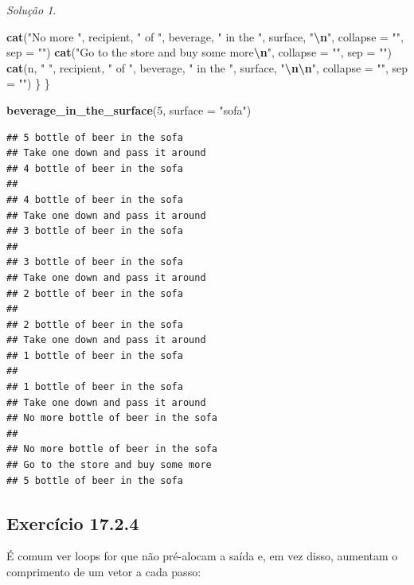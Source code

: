 \documentclass[
]{latex/krantz}
\newenvironment{Shaded}{\begin{snugshade}}{\end{snugshade}}
\newcommand{\AttributeTok}[1]{\textcolor[rgb]{0.13,0.29,0.53}{#1}}
\newcommand{\DecValTok}[1]{\textcolor[rgb]{0.00,0.00,0.81}{#1}}
\newcommand{\FunctionTok}[1]{\textcolor[rgb]{0.13,0.29,0.53}{\textbf{#1}}}
\newcommand{\NormalTok}[1]{#1}
\newcommand{\SpecialCharTok}[1]{\textcolor[rgb]{0.81,0.36,0.00}{\textbf{#1}}}
\newcommand{\StringTok}[1]{\textcolor[rgb]{0.31,0.60,0.02}{#1}}
\theoremstyle{definition}
\theoremstyle{definition}
\theoremstyle{definition}
\theoremstyle{definition}
\theoremstyle{remark}
\newtheorem*{solution}{Solução}
\begin{document}
\begin{solution}
\begin{Shaded}
\begin{Highlighting}[]
    \FunctionTok{cat}\NormalTok{(}\StringTok{"No more "}\NormalTok{, recipient, }\StringTok{" of "}\NormalTok{, beverage, }\StringTok{" in the "}\NormalTok{, surface, }\StringTok{"}\SpecialCharTok{\textbackslash{}n}\StringTok{"}\NormalTok{, }\AttributeTok{collapse =} \StringTok{""}\NormalTok{, }\AttributeTok{sep =} \StringTok{""}\NormalTok{)}
    \FunctionTok{cat}\NormalTok{(}\StringTok{"Go to the store and buy some more}\SpecialCharTok{\textbackslash{}n}\StringTok{"}\NormalTok{, }\AttributeTok{collapse =} \StringTok{""}\NormalTok{, }\AttributeTok{sep =} \StringTok{""}\NormalTok{)}
    \FunctionTok{cat}\NormalTok{(n, }\StringTok{" "}\NormalTok{, recipient, }\StringTok{" of "}\NormalTok{, beverage, }\StringTok{" in the "}\NormalTok{, surface, }\StringTok{"}\SpecialCharTok{\textbackslash{}n\textbackslash{}n}\StringTok{"}\NormalTok{, }\AttributeTok{collapse =} \StringTok{""}\NormalTok{, }\AttributeTok{sep =} \StringTok{""}\NormalTok{)}
\NormalTok{  \}}
\NormalTok{\}}

\FunctionTok{beverage\_in\_the\_surface}\NormalTok{(}\DecValTok{5}\NormalTok{, }\AttributeTok{surface =} \StringTok{"sofa"}\NormalTok{)}
\end{Highlighting}
\end{Shaded}

\begin{verbatim}
## 5 bottle of beer in the sofa
## Take one down and pass it around
## 4 bottle of beer in the sofa
## 
## 4 bottle of beer in the sofa
## Take one down and pass it around
## 3 bottle of beer in the sofa
## 
## 3 bottle of beer in the sofa
## Take one down and pass it around
## 2 bottle of beer in the sofa
## 
## 2 bottle of beer in the sofa
## Take one down and pass it around
## 1 bottle of beer in the sofa
## 
## 1 bottle of beer in the sofa
## Take one down and pass it around
## No more bottle of beer in the sofa
## 
## No more bottle of beer in the sofa
## Go to the store and buy some more
## 5 bottle of beer in the sofa
\end{verbatim}

\end{solution}

\hypertarget{exr17-2-4}{%
\subsection*{Exercício 17.2.4}\label{exr17-2-4}}

É comum ver loops for que não pré-alocam a saída e, em vez disso, aumentam o comprimento de um vetor a cada passo:
\end{document}
